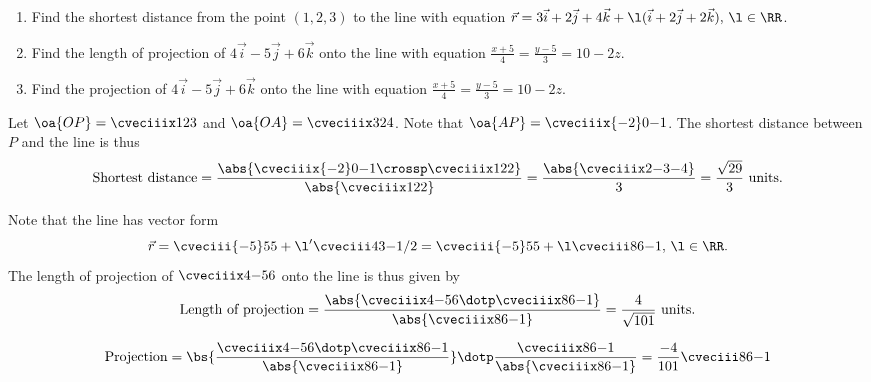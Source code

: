 \begin{problem}
    \begin{enumerate}
        \item Find the shortest distance from the point $(1, 2, 3)$ to the line with equation $\vec r = 3\vec i + 2\vec j + 4\vec k + \l(\vec i + 2\vec j + 2\vec k), \, \l \in \RR$.
        \item Find the length of projection of $4\vec i - 5 \vec j + 6 \vec k$ onto the line with equation $\frac{x+5}4 = \frac{y-5}3 = 10-2z$.
        \item Find the projection of $4\vec i - 5 \vec j + 6 \vec k$ onto the line with equation $\frac{x+5}4 = \frac{y-5}3 = 10-2z$.
    \end{enumerate}
\end{problem}
\begin{solution}
    \begin{ppart}
        Let $\oa{OP} = \cveciiix123$ and $\oa{OA} = \cveciiix324$. Note that $\oa{AP} = \cveciiix{-2}0{-1}$. The shortest distance between $P$ and the line is thus \[\text{Shortest distance} = \frac{\abs{\cveciiix{-2}0{-1} \crossp \cveciiix122}}{\abs{\cveciiix122}} = \frac{\abs{\cveciiix2{-3}{-4}}}3 = \frac{\sqrt{29}}3 \text{ units}.\]
    \end{ppart}
    \begin{ppart}
        Note that the line has vector form \[\vec r = \cveciii{-5}55 + \l' \cveciii43{-1/2} = \cveciii{-5}55 + \l \cveciii86{-1}, \, \l \in \RR.\] The length of projection of $\cveciiix4{-5}6$ onto the line is thus given by \[\text{Length of projection} = \frac{\abs{\cveciiix4{-5}6 \dotp \cveciiix86{-1}}}{\abs{\cveciiix86{-1}}} = \frac{4}{\sqrt{101}} \text{ units}.\]
    \end{ppart}
    \begin{ppart}
        \begin{align*}
            \text{Projection} = \bs{\frac{\cveciiix4{-5}6 \dotp \cveciiix86{-1}}{\abs{\cveciiix86{-1}}}} \dotp \frac{\cveciiix86{-1}}{\abs{\cveciiix86{-1}}} = \frac{-4}{101} \cveciii86{-1}
        \end{align*}
    \end{ppart}
\end{solution}

